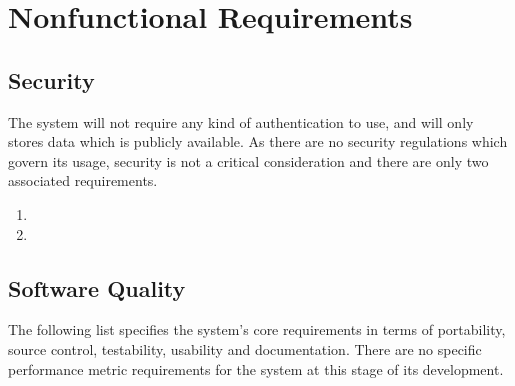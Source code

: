 \section{Nonfunctional Requirements}

\subsection{Security}
The system will not require any kind of authentication to use, and will only stores data which is publicly available. As there are no security regulations which govern its usage, security is not a critical consideration and there are only two associated requirements.
\begin{enumerate}[NF\thesubsection.1]
	\item{}
	\item{}
\end{enumerate}

\subsection{Software Quality}

The following list specifies the system's core requirements in terms of portability, source control, testability, usability and documentation. There are no specific performance metric requirements for the system at this stage of its development.

